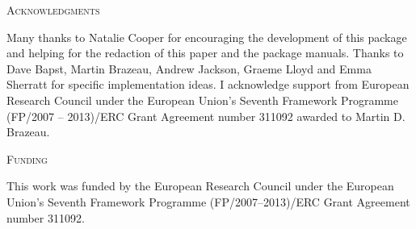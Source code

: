 \documentclass[12pt,letterpaper]{article}
\renewcommand{\section}[1]{%
\bigskip
\begin{center}
\begin{Large}
\normalfont\scshape #1
\medskip
\end{Large}
\end{center}}
\begin{document}





\section{Acknowledgments}
Many thanks to Natalie Cooper for encouraging the development of this package and helping for the redaction of this paper and the package manuals.
Thanks to Dave Bapst, Martin Brazeau, Andrew Jackson, Graeme Lloyd and Emma Sherratt for specific implementation ideas.
I acknowledge support from European Research Council under the European Union's Seventh Framework Programme (FP/2007 – 2013)/ERC Grant Agreement number 311092 awarded to Martin D. Brazeau.

\section{Funding}
This work was funded by the European Research Council under the European Union's Seventh Framework Programme (FP/2007–2013)/ERC Grant Agreement number 311092.



\end{document}
